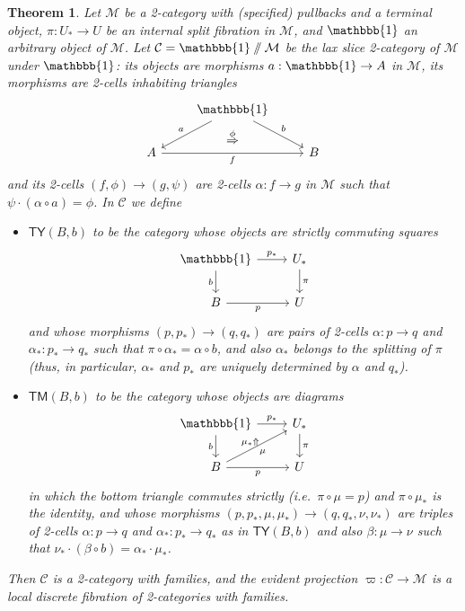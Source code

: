 \documentclass[10pt]{article}
\newtheorem{theorem}{Theorem}
\theoremstyle{definition}
\newcommand\M{\mathcal{M}}
\newcommand\C{\mathcal{C}}
\newcommand\Cty{\mathsf{TY}}
\newcommand\Ctm{\mathsf{TM}}
\newcommand\vp{\varpi}
\newcommand\one{\mathbbb{1}}
\let\lslice\sslash
\newcommand\Un{U}
\newcommand\Ub{U_*}
\newcommand\pb{p_*}
\newcommand\qb{q_*}
\newcommand\alb{\alpha_*}
\newcommand\mub{\mu_*}
\newcommand\nub{\nu_*}
\begin{document}
\begin{theorem}\label{thm:fib2cwf-univ}
  Let $\M$ be a 2-category with (specified) pullbacks and a terminal object, $\pi:\Ub\to\Un$ be an internal split fibration in $\M$, and $\one$ an arbitrary object of $\M$. %
  Let $\C = \one\lslice\M$ be the lax slice 2-category of $\M$ under $\one$: its objects are morphisms $a:\one\to A$ in $\M$, its morphisms are 2-cells inhabiting triangles
  \begin{equation}\label{eq:laxslice-mor}
    \begin{tikzcd}
      & \one \ar[dl,"a"'] \ar[dr,"b"] \ar[d,phantom,"\overset{\phi}{\Rightarrow}"] \\
      A \ar[rr,"f"'] & {}& B
    \end{tikzcd}
  \end{equation}
  and its 2-cells $(f,\phi) \to (g,\psi)$ are 2-cells $\alpha :f\to g$ in $\M$ such that $\psi\cdot (\alpha\circ a) = \phi$.
  In $\C$ we define
  \begin{itemize}
  \item $\Cty(B,b)$ to be the category whose objects are strictly commuting squares
    \[
      \begin{tikzcd}
        \one \ar[d,"b"'] \ar[r,"\pb"] & \Ub \ar[d,"\pi"] \\
        B \ar[r,"p"'] & \Un
      \end{tikzcd}
    \]
    and whose morphisms $(p,\pb) \to (q,\qb)$ are pairs of 2-cells $\alpha:p\to q$ and $\alb : \pb \to \qb$ such that $\pi \circ \alb = \alpha\circ  b$, and also $\alb$ belongs to the splitting of $\pi$ (thus, in particular, $\alb$ and $\pb$ are uniquely determined by $\alpha$ and $\qb$).
  \item $\Ctm(B,b)$ to be the category whose objects are diagrams
    \[
      \begin{tikzcd}
        \one \ar[d,"b"'] \ar[r,"\pb"] \ar[dr,phantom,near start,"\scriptstyle\mub\Uparrow"] & \Ub \ar[d,"\pi"] \\
        B \ar[r,"p"']\ar[ur,"\mu"'] & \Un
      \end{tikzcd}
    \]
    in which the bottom triangle commutes strictly (i.e.\ $\pi\circ \mu = p$) and $\pi\circ \mub$ is the identity, and whose morphisms $(p,\pb,\mu,\mub) \to (q,\qb,\nu,\nub)$ are triples of 2-cells $\alpha:p\to q$ and $\alb : \pb \to \qb$ as in $\Cty(B,b)$ and also $\beta:\mu\to\nu$ such that $\nub \cdot (\beta\circ b) = \alb \cdot \mub$.
  \end{itemize}
  Then $\C$ is a 2-category with families, and the evident projection $\vp:\C\to\M$ is a local discrete fibration of 2-categories with families.
\end{theorem}
\end{document}
